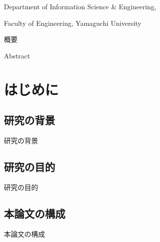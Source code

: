 \documentclass[11pt,a4j]{jreport}
\begin{document}
    \begin{center}
      {\LARGE {} \par} 
      {\large Department of Information Science \& Engineering, \par}
      {\large Faculty of Engineering, Yamaguchi University \par}
    \end{center}

  \newpage




  \thispagestyle{empty}
  \begin{center}
    \LARGE {}
  \end{center}
  概要
  \begin{center}
    \LARGE {}
  \end{center}
  Abstract

  \newpage




  \thispagestyle{empty}
  \tableofcontents
  
  \lhead{\rightmark}
  \renewcommand{\chaptermark}[1]{
    \markboth{第\ \normalfont\thechapter\ 章~~#1}{}
  }




  \addtocounter{page}{-3} %




  \chapter{はじめに}
    \section{研究の背景}
      研究の背景
    \section{研究の目的}
      研究の目的
    \section{本論文の構成}
      本論文の構成
  \newpage
\end{document}

